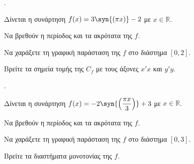 \documentclass[11pt,a4paper,twocolumn]{article}
\newcounter{askhsh}
\newcommand{\askhsh}{{\large\theaskhsh.}\ \addtocounter{askhsh}{1}}
\begin{document}
\askhsh Δίνεται η συνάρτηση $f(x)=3\syn{\left(\pi x\right)}-2$ με $x\in\mathbb{R}$.
\begin{alist}
\item Να βρεθούν η περίοδος και τα ακρότατα της $f$.
\item Να χαράξετε τη γραφική παράσταση της $f$ στο διάστημα $[0,2]$.
\item Βρείτε τα σημεία τομής της $C_f$ με τους άξονες $x'x$ και $y'y$.
\end{alist}
\askhsh Δίνεται η συνάρτηση $f(x)=-2\syn{\left(\dfrac{\pi x}{3}\right)}+3$ με $x\in\mathbb{R}$.
\begin{alist}
\item Να βρεθούν η περίοδος και τα ακρότατα της $f$.
\item Να χαράξετε τη γραφική παράσταση της $f$ στο διάστημα $[0,3]$.
\item Βρείτε τα διαστήματα μονοτονίας της $f$.
\end{alist}
\end{document}

